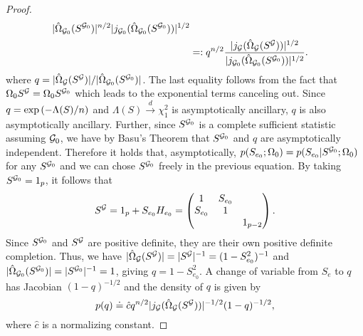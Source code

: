 \begin{proof}
\begin{align*}
            {|\hat\Omega_{{\mathcal{G}}_0}(S^{{\mathcal{G}}_0})|^{n/2} |j_{{\mathcal{G}}_0}(\hat\Omega_{{\mathcal{G}}_0}(S^{{\mathcal{G}}_0})) |^{1/2}}\\
        &=: q^{n/2} \frac{|j_{\mathcal{G}}(\hat\Omega_{\mathcal{G}}(S^{\mathcal{G}})) |^{1/2}}    {|j_{{\mathcal{G}}_0}(\hat\Omega_{{\mathcal{G}}_0}(S^{{\mathcal{G}}_0})) |^{1/2}}.
    \end{align*}
    where $q = |\hat\Omega_{\mathcal{G}}(S^{\mathcal{G}})| / |\hat\Omega_{{\mathcal{G}}_0}(S^{{\mathcal{G}}_0})|$. The last equality follows from the fact that $\Omega_0 S^{\mathcal{G}} = \Omega_0 S^{{\mathcal{G}}_0}$ which leads to the exponential terms canceling out. Since $q = \exp\left(-\Lambda(S) / n\right)$ and  $\Lambda(S) \xrightarrow{d} \chi^2_1$ is asymptotically ancillary, $q$ is also asymptotically ancillary. Further, since $S^{{\mathcal{G}}_0}$ is a complete sufficient statistic assuming ${\mathcal{G}}_0$, we have by Basu's Theorem \cite{10.2307/25048259} that $S^{{\mathcal{G}}_0}$ and $q$ are asymptotically independent. Therefore it holds that, asymptotically, $p(S_{e_0}; \Omega_0) = p(S_{e_0} | S^{{\mathcal{G}}_0}; \Omega_0)$ for any $S^{{\mathcal{G}}_0}$ and we can chose $S^{{\mathcal{G}}_0}$ freely in the previous equation. By taking $S^{{\mathcal{G}}_0} = 1_p$, it follows that
    \begin{equation*}
        S^{\mathcal{G}} = 1_p + S_{e_0} H_{e_0} = \begin{pmatrix}
            1   & S_{e_0} & \\
            S_{e_0} & 1 & \\
                &   & 1_{p-2}
        \end{pmatrix}.
    \end{equation*}
    Since $S^{{\mathcal{G}}_0}$ and $S^{\mathcal{G}}$ are positive definite, they are their own positive definite completion. Thus, we have $|\hat\Omega_{\mathcal{G}}(S^{\mathcal{G}})| = |S^{\mathcal{G}}|^{-1} = (1 - S_{e_0}^2)^{-1}$ and $|\hat\Omega_{{\mathcal{G}}_0}(S^{{\mathcal{G}}_0})| = |S^{{\mathcal{G}}_0}|^{-1} = 1$, giving $q = 1 - S_{e_0}^2$. A change of variable from $S_e$ to $q$ has Jacobian $(1 - q)^{-1/2}$ and the density of $q$ is given by
    \begin{equation} \label{eq-proof-almost-done}
        p(q) \doteq \hat c q^{n/2} |j_{{\mathcal{G}}}(\hat\Omega_{{\mathcal{G}}}(S^{{\mathcal{G}}})) |^{-1/2} (1 - q)^{-1/2},
    \end{equation}
    where $\hat c$ is a normalizing constant.


\end{proof}
